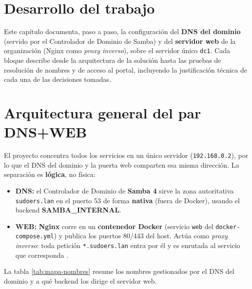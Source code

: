 
\section{Desarrollo del trabajo}

Este cap\'itulo documenta, paso a paso, la configuraci\'on del \textbf{DNS del
dominio} (servido por el Controlador de Dominio de Samba) y del \textbf{servidor
web} de la organizaci\'on (Nginx como \textit{proxy inverso}), sobre el
servidor \'unico \texttt{dc1}. Cada bloque describe desde la arquitectura de la
soluci\'on hasta las pruebas de resoluci\'on de nombres y de acceso al portal,
incluyendo la justificaci\'on t\'ecnica de cada una de las decisiones tomadas.

\section{Arquitectura general del par DNS+WEB}

El proyecto concentra todos los servicios en un \'unico servidor
(\texttt{192.168.0.2}), por lo que el DNS del dominio y la puerta web
comparten esa misma direcci\'on. La separaci\'on es \textbf{l\'ogica}, no
f\'isica: \citep{tanenbaum2012}

\begin{itemize}
  \item \textbf{DNS:} el Controlador de Dominio de \textbf{Samba 4} sirve la
        zona autoritativa \texttt{sudoers.lan} en el puerto 53 de forma
        \textbf{nativa} (fuera de Docker), usando el backend
        \textbf{SAMBA\_INTERNAL}.
  \item \textbf{WEB:} \textbf{Nginx} corre en un \textbf{contenedor Docker}
        (servicio \texttt{web} del \texttt{docker-compose.yml}) y publica los
        puertos 80/443 del host. Act\'ua como \textit{proxy inverso}: toda
        petici\'on \texttt{*.sudoers.lan} entra por \'el y es enrutada al
        servicio que corresponda \citep{nginxDocs}.
\end{itemize}

La tabla \ref{tab:mapa-nombres} resume los nombres gestionados por el DNS del
dominio y a qu\'e backend los dirige el servidor web.


